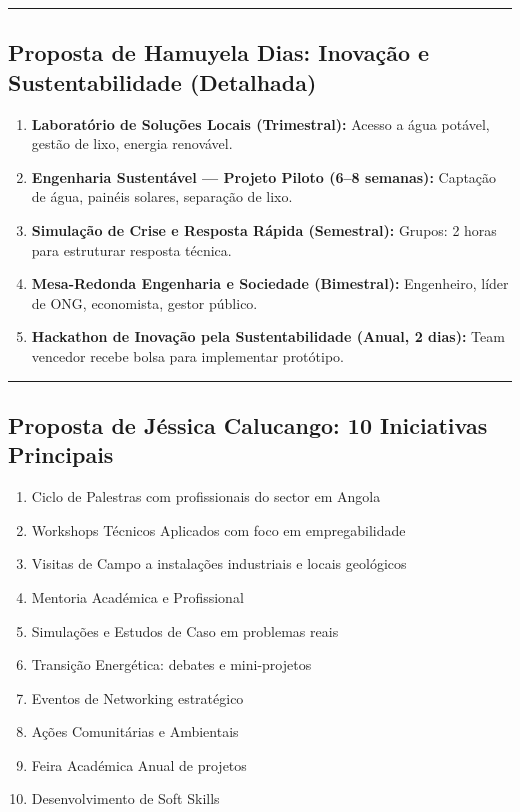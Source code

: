 \documentclass[12pt,a4paper]{article}
\newcommand{\proposalsep}{%
  \vspace{6pt}%
  {\color{gold}\rule{0.35\linewidth}{0.7pt}}%
  \vspace{4pt}%
}
\begin{document}
\proposalsep

\subsection{Proposta de Hamuyela Dias: Inovação e Sustentabilidade (Detalhada)}

\begin{enumerate}
    \item \textbf{Laboratório de Soluções Locais (Trimestral):} Acesso a água potável, gestão de lixo, energia renovável.
    \item \textbf{Engenharia Sustentável — Projeto Piloto (6–8 semanas):} Captação de água, painéis solares, separação de lixo.
    \item \textbf{Simulação de Crise e Resposta Rápida (Semestral):} Grupos: 2 horas para estruturar resposta técnica.
    \item \textbf{Mesa-Redonda Engenharia e Sociedade (Bimestral):} Engenheiro, líder de ONG, economista, gestor público.
    \item \textbf{Hackathon de Inovação pela Sustentabilidade (Anual, 2 dias):} Team vencedor recebe bolsa para implementar protótipo.
\end{enumerate}

\proposalsep

\subsection{Proposta de Jéssica Calucango: 10 Iniciativas Principais}

\begin{enumerate}
    \item Ciclo de Palestras com profissionais do sector em Angola
    \item Workshops Técnicos Aplicados com foco em empregabilidade
    \item Visitas de Campo a instalações industriais e locais geológicos
    \item Mentoria Académica e Profissional
    \item Simulações e Estudos de Caso em problemas reais
    \item Transição Energética: debates e mini-projetos
    \item Eventos de Networking estratégico
    \item Ações Comunitárias e Ambientais
    \item Feira Académica Anual de projetos
    \item Desenvolvimento de Soft Skills
\end{enumerate}
\end{document}
